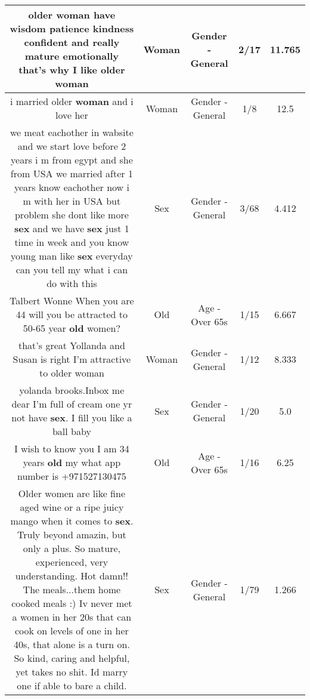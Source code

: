 \documentclass[11pt]{article}
\newlength\mylength
\begin{document}
\begin{center}
\begin{longtable}{|C{.65\mylength}|C{.30\mylength}|C{.12\mylength}|C{.12\mylength}|C{.12\mylength}|}
  \small older \textbf{woman} have wisdom patience kindness confident and really mature emotionally that's why I like older woman\normalsize   & Woman & Gender - General & 2/17 & 11.765 \\  \hline
  \small i married older \textbf{woman} and i love her\normalsize   & Woman & Gender - General & 1/8 & 12.5 \\  \hline
  \small we meat eachother in wabsite and we start love before 2 years i m from egypt and she from USA  we married after 1 years know eachother  now i m with her in USA but problem she dont like more \textbf{sex} and we have \textbf{sex} just 1 time in week and you know young man like \textbf{sex} everyday can you tell my what i can do with this\normalsize   & Sex & Gender - General & 3/68 & 4.412 \\  \hline
  \small Talbert Wonne When you are 44 will you be attracted to 50-65 year \textbf{old} women?\normalsize   & Old & Age - Over 65s & 1/15 & 6.667 \\  \hline
  \small that's great Yollanda and Susan is right I'm attractive to older woman\normalsize   & Woman & Gender - General & 1/12 & 8.333 \\  \hline
  \small yolanda brooks.Inbox me dear I'm full of cream one yr not have \textbf{sex}. I fill you like a ball baby\normalsize   & Sex & Gender - General & 1/20 & 5.0 \\  \hline
  \small I wish to know you I am 34 years \textbf{old} my what app number is +971527130475\normalsize   & Old & Age - Over 65s & 1/16 & 6.25 \\  \hline
  \small Older women are like fine aged wine or a ripe juicy mango when it comes to \textbf{sex}.  Truly beyond amazin, but only a plus. So mature, experienced, very understanding. Hot damn!! The meals...them home cooked meals :) Iv never met a women in her 20s that can cook on levels of one in her 40s, that alone is a turn on.  So kind, caring and helpful, yet takes no shit. Id marry one if able to bare a child.\normalsize   & Sex & Gender - General & 1/79 & 1.266 \\  \hline

\end{longtable}
\end{center}
\end{document}
